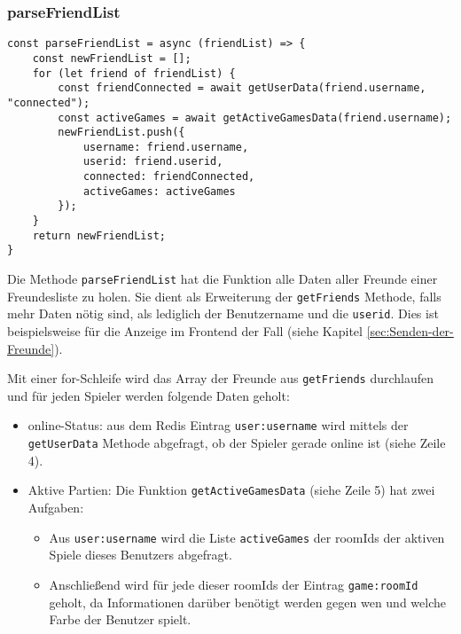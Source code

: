 \subsubsection{parseFriendList}
\label{sec:parseFriendList}

\begin{lstlisting}[style=codeStyle, caption={Methode um alle Informationen eines Arrays von Freunden zu bekommen}, label={lst:parseFriendList}]
const parseFriendList = async (friendList) => {
    const newFriendList = [];
    for (let friend of friendList) {
        const friendConnected = await getUserData(friend.username, "connected");
        const activeGames = await getActiveGamesData(friend.username);
        newFriendList.push({
            username: friend.username,
            userid: friend.userid,
            connected: friendConnected,
            activeGames: activeGames
        });
    }
    return newFriendList;
}
\end{lstlisting}

Die Methode \verb|parseFriendList| hat die Funktion alle Daten aller Freunde einer Freundesliste zu holen. Sie dient als Erweiterung der \verb|getFriends| Methode, falls mehr Daten nötig sind, als lediglich der Benutzername und die \verb|userid|. Dies ist beispielsweise für die Anzeige im Frontend der Fall (siehe Kapitel \ref{sec:Senden-der-Freunde}).

Mit einer for-Schleife wird das Array der Freunde aus \verb|getFriends| durchlaufen und für jeden Spieler werden folgende Daten geholt:

\begin{itemize}
\item online-Status: aus dem Redis Eintrag \verb|user:username| wird mittels der \verb|getUserData| Methode abgefragt, ob der Spieler gerade online ist (siehe Zeile 4).
\item Aktive Partien: Die Funktion \verb|getActiveGamesData| (siehe Zeile 5) hat zwei Aufgaben:

\begin{itemize}
\item Aus \verb|user:username| wird die Liste \verb|activeGames| der roomIds der aktiven Spiele dieses Benutzers abgefragt.
\item Anschließend wird für jede dieser roomIds der Eintrag \verb|game:roomId| geholt, da Informationen darüber benötigt werden gegen wen und welche Farbe der Benutzer spielt.
\end{itemize}
\end{itemize}

